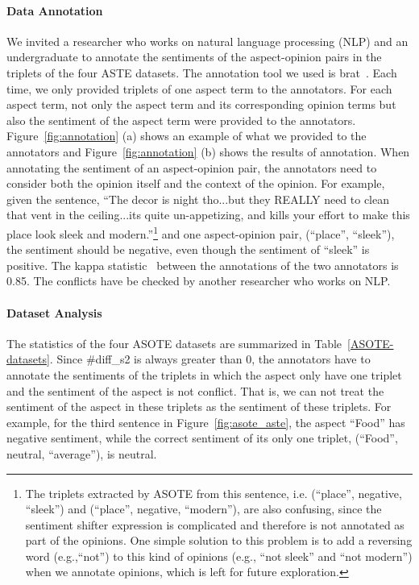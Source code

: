 \documentclass[11pt]{article}
\begin{document}
\paragraph{Data Annotation} We invited a researcher who works on natural language processing (NLP) and an undergraduate to annotate the sentiments of the aspect-opinion pairs in the triplets of the four ASTE datasets. The annotation tool we used is brat~\citep{stenetorp-etal-2012-brat}. Each time, we only provided triplets of one aspect term to the annotators. For each aspect term, not only the aspect term and its corresponding opinion terms but also the sentiment of the aspect term were provided to the annotators. Figure~\ref{fig:annotation} (a) shows an example of what we provided to the annotators and Figure~\ref{fig:annotation} (b) shows the results of annotation. When annotating the sentiment of an aspect-opinion pair, the annotators need to consider both the opinion itself and the context of the opinion. For example, given the sentence, ``The decor is night tho...but they REALLY need to clean that vent in the ceiling...its quite un-appetizing, and kills your effort to make this place look sleek and modern.''\footnote{The triplets extracted by ASOTE from this sentence, i.e. (``place'', negative, ``sleek'') and (``place'', negative, ``modern''), are also confusing, since the sentiment shifter expression is complicated and therefore is not annotated as part of the opinions. One simple solution to this problem is to add a reversing word (e.g.,``not'') to this kind of opinions (e.g., ``not sleek'' and ``not modern'') when we annotate opinions, which is left for future exploration.} and one aspect-opinion pair, (``place'', ``sleek''), the sentiment should be negative, even though the sentiment of ``sleek'' is positive. The kappa statistic~\citep{doi:10.1177/001316446002000104} between the annotations of the two annotators is 0.85. The conflicts have be checked by another researcher who works on  NLP.

\paragraph{Dataset Analysis} The statistics of the four ASOTE datasets are summarized in Table~\ref{ASOTE-datasets}. Since \#diff\_s2 is always greater than 0,  the annotators have to annotate  the sentiments of the triplets in which the aspect only have one triplet and the sentiment of the aspect is not conflict. That is, we can not treat the sentiment of the aspect in these triplets as the sentiment of these triplets. For example, for the third sentence in Figure~\ref{fig:asote_aste}, the aspect ``Food'' has negative sentiment, while the correct sentiment of its only one triplet, (``Food'', neutral, ``average''), is neutral.
\end{document}
